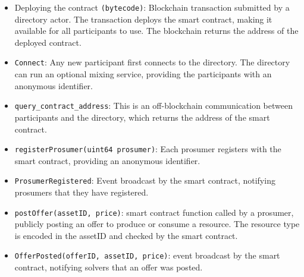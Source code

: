 \begin{itemize}[leftmargin=*]
\setlength{\itemsep}{0pt}%
    \setlength{\topsep}{0pt} 
    \setlength{\partopsep}{0pt}
    \setlength{\parsep}{0pt}
    \setlength{\parskip}{0pt}%
\item Deploying the contract \texttt{(bytecode)}: 
Blockchain transaction submitted by a directory actor.  The transaction deploys the smart contract, making it available for all participants to use. The blockchain returns the address of the deployed contract.
\item \texttt{Connect}:  Any new participant first connects to the directory. The directory can run an optional mixing service, providing the participants with an anonymous identifier.
\item \texttt{query\_contract\_address}:  This is an off-blockchain communication between participants and the directory, which returns the address of the smart contract. 
\item \texttt{registerProsumer(uint64 prosumer)}:  Each prosumer registers with the smart contract, providing an anonymous identifier.
\item \texttt{ProsumerRegistered}:  Event broadcast by the smart contract, notifying prosumers that they have registered. 
\item \texttt{postOffer(assetID, price)}:  smart contract function called by a prosumer, publicly posting an offer to produce or consume a resource. The resource type is encoded in the assetID and checked by the smart contract.
\item \texttt{OfferPosted(offerID, assetID, price)}: event broadcast by the smart contract, notifying solvers that an offer was posted.

\end{itemize}
